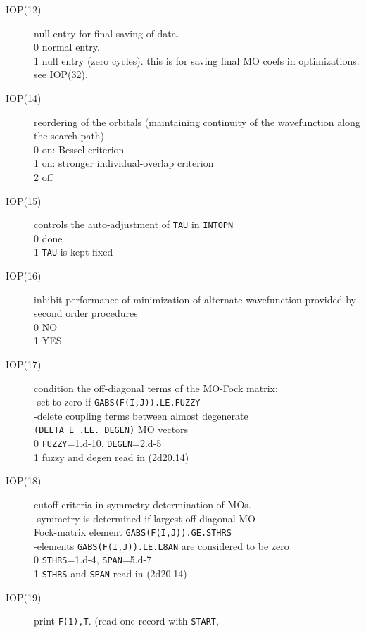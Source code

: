 \begin{description}
\item[IOP(12)]  null entry for final saving of data.  \\
0  normal entry. \\
1  null entry (zero cycles). this is for saving 
final MO coefs in optimizations. see IOP(32).  \\
\item[IOP(14)]  reordering of the orbitals (maintaining continuity
of the wavefunction along the search path)  \\
0  on: Bessel criterion \\
1  on: stronger individual-overlap criterion \\
2  off \\
\item[IOP(15)]  controls the auto-adjustment of {\tt TAU} in {\tt INTOPN}  \\
0  done \\
1  {\tt TAU} is kept fixed \\
\item[IOP(16)]  inhibit performance of minimization of alternate
wavefunction provided by second order procedures  \\
0  NO \\
1  YES \\
\item[IOP(17)]  condition the off-diagonal terms of the MO-Fock
matrix:  \\
-set to zero if {\tt GABS(F(I,J)).LE.FUZZY}  \\
-delete coupling terms between almost degenerate  \\
{\tt (DELTA E .LE. DEGEN)} MO vectors  \\
0  {\tt FUZZY}=1.d-10, {\tt DEGEN}=2.d-5 \\
1  fuzzy and degen read in (2d20.14) \\
\item[IOP(18)]  cutoff criteria in symmetry determination of MOs.  \\
-symmetry is determined if largest off-diagonal MO  \\
Fock-matrix element {\tt GABS(F(I,J)).GE.STHRS}  \\
-elements {\tt GABS(F(I,J)).LE.L8AN} are considered to be zero  \\
0  {\tt STHRS}=1.d-4, {\tt SPAN}=5.d-7 \\
1  {\tt STHRS} and {\tt SPAN} read in (2d20.14) \\
\item[IOP(19)]  print {\tt F(1),T}. (read one record with {\tt START},

\end{description}

